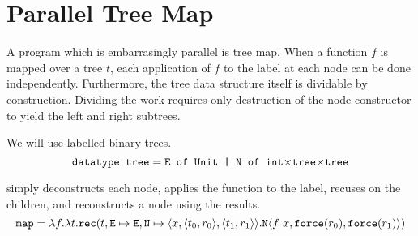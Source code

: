 \section{Parallel Tree Map}
A program which is embarrasingly parallel is tree map.
When a function $f$ is mapped over a tree $t$, each application of $f$ to the label at each node can be done independently.
Furthermore, the tree data structure itself is dividable by construction.
Dividing the work requires only destruction of the node constructor to yield the left and right subtrees.

We will use  labelled binary trees.
\begin{equation*}
  \texttt{datatype tree} = \texttt{E of Unit | N of int$\times$tree$\times$tree}
\end{equation*}

 simply deconstructs each node, applies the function to the label, recuses on the children, and reconstructs a node using the results.
\begin{equation*}
  \texttt{map} = \lambda f.\lambda t.\texttt{rec}(t, \texttt{E} \mapsto \texttt{E}, \texttt{N} \mapsto \langle x, \langle t_0, r_0 \rangle, \langle t_1, r_1 \rangle\rangle.\texttt{N} \langle f\ x, \texttt{force}(r_0), \texttt{force}(r_1)\rangle)
\end{equation*}

